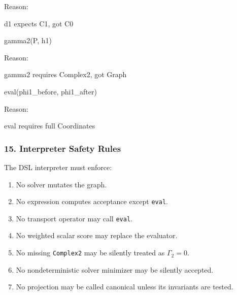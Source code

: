 \documentclass[
]{article}
\newenvironment{Shaded}{\begin{snugshade}}{\end{snugshade}}
\newcommand{\NormalTok}[1]{\textcolor[rgb]{0.12,0.11,0.11}{#1}}
\providecommand{\tightlist}{%
  \setlength{\itemsep}{0pt}\setlength{\parskip}{0pt}}
\providecommand{\tightlist}{%
  \setlength{\itemsep}{0pt}\setlength{\parskip}{0pt}}
\begin{document}
Reason:

\begin{Shaded}
\begin{Highlighting}[]
\NormalTok{d1 expects C1, got C0}
\end{Highlighting}
\end{Shaded}

\begin{Shaded}
\begin{Highlighting}[]
\NormalTok{gamma2(P, h1)}
\end{Highlighting}
\end{Shaded}

Reason:

\begin{Shaded}
\begin{Highlighting}[]
\NormalTok{gamma2 requires Complex2, got Graph}
\end{Highlighting}
\end{Shaded}

\begin{Shaded}
\begin{Highlighting}[]
\NormalTok{eval(phi1\_before, phi1\_after)}
\end{Highlighting}
\end{Shaded}

Reason:

\begin{Shaded}
\begin{Highlighting}[]
\NormalTok{eval requires full Coordinates}
\end{Highlighting}
\end{Shaded}

\subsubsection{15. Interpreter Safety Rules}\label{interpreter-safety-rules}

The DSL interpreter must enforce:

\begin{enumerate}
\def\labelenumi{\arabic{enumi}.}
\tightlist
\item
  No solver mutates the graph.
\item
  No expression computes acceptance except \texttt{eval}.
\item
  No transport operator may call \texttt{eval}.
\item
  No weighted scalar score may replace the evaluator.
\item
  No missing \texttt{Complex2} may be silently treated as \(\Gamma_2=0\).
\item
  No nondeterministic solver minimizer may be silently accepted.
\item
  No projection may be called canonical unless its invariants are tested.
\end{enumerate}
\end{document}

